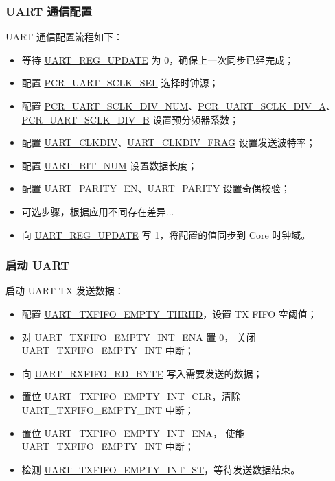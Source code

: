 \documentclass[main\_\_CN.tex]{subfiles}
\begin{document}
\subsubsection{UART 通信配置}

UART 通信配置流程如下：
\begin{itemize}
    \item 等待 \hyperref[fielddesc:UARTREGUPDATE]{UART\_REG\_UPDATE} 为 0，确保上一次同步已经完成；
    \item 配置 \hyperref[fielddesc:PCRUART0SCLKSEL]{PCR\_UART\_SCLK\_SEL} 选择时钟源；
    \item 配置 \hyperref[fielddesc:PCRUART0SCLKDIVNUM]{PCR\_UART\_SCLK\_DIV\_NUM}、\hyperref[fielddesc:PCRUART0SCLKDIVA]{PCR\_UART\_SCLK\_DIV\_A}、\hyperref[fielddesc:PCRUART0SCLKDIVB]{PCR\_UART\_SCLK\_DIV\_B} 设置预分频器系数；
    \item 配置 \hyperref[fielddesc:UARTCLKDIV]{UART\_CLKDIV}、\hyperref[fielddesc:UARTCLKDIVFRAG]{UART\_CLKDIV\_FRAG} 设置发送波特率；
    \item 配置 \hyperref[fielddesc:UARTBITNUM]{UART\_BIT\_NUM} 设置数据长度；
    \item 配置 \hyperref[fielddesc:UARTPARITYEN]{UART\_PARITY\_EN}、\hyperref[fielddesc:UARTPARITY]{UART\_PARITY} 设置奇偶校验；
    \item 可选步骤，根据应用不同存在差异...
    \item 向 \hyperref[fielddesc:UARTREGUPDATE]{UART\_REG\_UPDATE} 写 1，将配置的值同步到 Core 时钟域。
\end{itemize}
\subsubsection{启动 UART}
启动 UART TX 发送数据：
\begin{itemize}
    \item 配置 \hyperref[fielddesc:UARTTXFIFOEMPTYTHRHD]{UART\_TXFIFO\_EMPTY\_THRHD}，设置 TX FIFO 空阈值；
    \item 对 \hyperref[fielddesc:UARTTXFIFOEMPTYINTENA]{UART\_TXFIFO\_EMPTY\_INT\_ENA} 置 0， 关闭 UART\_TXFIFO\_EMPTY\_INT 中断；
    \item 向 \hyperref[fielddesc:UARTRXFIFORDBYTE]{UART\_RXFIFO\_RD\_BYTE} 写入需要发送的数据；
    \item 置位 \hyperref[fielddesc:UARTTXFIFOEMPTYINTCLR]{UART\_TXFIFO\_EMPTY\_INT\_CLR}，清除 UART\_TXFIFO\_EMPTY\_INT 中断；
    \item 置位 \hyperref[fielddesc:UARTTXFIFOEMPTYINTENA]{UART\_TXFIFO\_EMPTY\_INT\_ENA}， 使能 UART\_TXFIFO\_EMPTY\_INT 中断；
    \item 检测 \hyperref[fielddesc:UARTTXFIFOEMPTYINTST]{UART\_TXFIFO\_EMPTY\_INT\_ST}，等待发送数据结束。 
\end{itemize}
\end{document}
